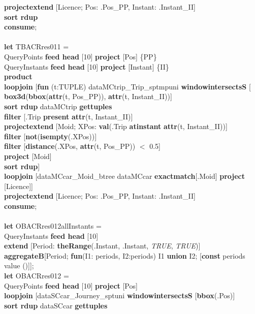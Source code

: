 \documentclass[a4paper]{article}
\newcommand{\op}[1]{\textbf{#1}}
\newcommand{\true}{\textsl{TRUE}}
\begin{document}
\begin{scriptsize}
\begin{tabbing}
\>\op{projectextend} [Licence; Pos: .Pos\_PP, Instant: .Instant\_II]\\
\>\op{sort rdup}\\
\op{consume};\\
\\
\op{let} TBACRres011 =\\
\>QueryPoints \op{feed head} [10] \op{project} [Pos] \{PP\}\\
\>QueryInstants \op{feed head} [10] \op{project} [Instant] \{II\}\\
\>\op{product}\\
\>\op{loopjoin} [\op{fun} (t:TUPLE) dataMCtrip\_Trip\_sptmpuni \op{windowintersectsS} [\\
\>\>\>\>\op{box3d}(\op{bbox}(\op{attr}(t, Pos\_PP)), \op{attr}(t, Instant\_II))]\\
\>\>\op{sort rdup} dataMCtrip \op{gettuples}\\
\>\>\op{filter} [.Trip \op{present} \op{attr}(t, Instant\_II)]\\
\>\>\op{projectextend} [Moid; XPos: \op{val}(.Trip \op{atinstant} \op{attr}(t, Instant\_II))]\\
\>\>\op{filter} [\op{not}(\op{isempty}(.XPos))]\\
\>\>\op{filter} [\op{distance}(.XPos, \op{attr}(t, Pos\_PP)) $<$ 0.5]\\
\>\>\op{project} [Moid]\\
\>\>\op{sort rdup}]\\
\>\op{loopjoin} [dataMCcar\_Moid\_btree dataMCcar \op{exactmatch}[.Moid] \op{project} [Licence]]\\
\>\op{projectextend} [Licence; Pos: .Pos\_PP, Instant: .Instant\_II]\\
\op{consume};\\
\\
\op{let} OBACRres012allInstants =\\
\>QueryInstants \op{feed head} [10]\\
\>\op{extend} [Period: \op{theRange}(.Instant, .Instant, \true{}, \true{})]\\
\>\op{aggregateB}[Period; \op{fun}(I1: periods, I2:periods) I1 \op{union} I2; [\op{const} periods value ()]];\\
\op{let} OBACRres012 =\\
\>QueryPoints \op{feed head} [10] \op{project} [Pos]\\
\>\>\op{loopjoin} [dataSCcar\_Journey\_sptuni \op{windowintersectsS} [\op{bbox}(.Pos)]\\
\>\>\>\op{sort rdup} dataSCcar \op{gettuples}\\

\end{tabbing}
\end{scriptsize}
\end{document}
